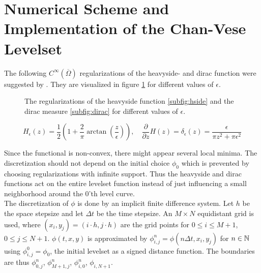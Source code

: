 \section{Numerical Scheme and Implementation of the Chan-Vese Levelset}
The following $C^\infty(\overline{\Omega})$ regularizations of the heavyside- and dirac function were suggested by \cite{chan.01}. They are visualized in figure \ref{fig:regularizations} for different values of $\epsilon$.
\begin{figure}
  \centering
  \quad
  \caption{The regularizations of the heavyside function \ref{subfig:hside} and the dirac measure \ref{subfig:dirac} for different values of $\epsilon$.}\label{fig:regularizations}
\end{figure}

\begin{equation}
  H_\epsilon(z) = \frac{1}{2}\left(1+\frac{2}{\pi}\arctan\left(\frac{z}{\epsilon}\right)\right),\quad \frac{\partial}{\partial z}H(z) = \delta_\epsilon(z) = \frac{\epsilon}{\pi z^2+\pi\epsilon^2}
\end{equation}

Since the functional is non-convex, there might appear several local minima. The discretization should not depend on the initial choice $\phi_0$ which is prevented by choosing regularizations with infinite support. Thus the heavyside and dirac functions act on the entire levelset function instead of just influencing a small neighborhood around the 0'th level curve.\\
\iffalse
\begin{figure}
        \centering
        \begin{subfigure}[b]{0.5\textwidth}
                \centering
                \texttt{[image: figures/Hside.eps]}
        \end{subfigure}%
        ~ %
        \begin{subfigure}[b]{0.5\textwidth}
                \centering
                \texttt{[image: figures/Dirac.eps]}
        \end{subfigure}

\end{figure}
\fi

The discretization of $\phi$ is done by an implicit finite difference system. Let $h$ be the space stepsize and let $\Delta t$ be the time stepsize. An $M\times N$ equidistant grid is used, where $(x_i,y_j) = (i\cdot h,j\cdot h)$ are the grid points for $0\leq i \leq M+1$, $0\leq j \leq N+1$. $\phi(t,x,y)$ is approximated by $\phi_{i,j}^n = \phi(n\Delta t, x_i,y_j)$ for $n\in\mathbb N$ using $\phi_{i,j}^0 = \phi_0$, the initial levelset as a signed distance function. The boundaries are thus $\phi_{0,j}^n$, $\phi_{M+1,j}^n$, $\phi_{i,0}^n$, $\phi_{i,N+1}$.\\

